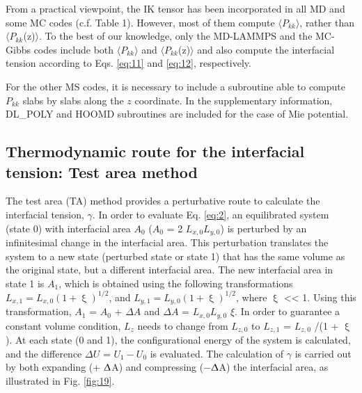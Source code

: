 \documentclass[9pt,bestpractices]{livecoms}
\begin{document}
From a practical viewpoint, the IK tensor has been incorporated in all MD and
some MC codes (c.f. Table 1). However, most of them compute
${\langle}P_{kk}{\rangle}$, rather than
${\langle}P_{kk}$(z)${\rangle}$. To the best of our knowledge, only
the MD-LAMMPS and the MC-Gibbs codes include both
${\langle}P_{kk}{\rangle}$ and
${\langle}P_{kk}$(z)${\rangle}$ and also compute the interfacial
tension according to Eqs. \ref{eq:11} and \ref{eq:12}, respectively.

For the other MS codes, it is necessary to include a subroutine able to compute
$P_{kk}$ slabs by slabs along the $z$ coordinate. In the
supplementary information, DL\_POLY and HOOMD subroutines are included for the case of Mie
potential. 

\subsection{Thermodynamic route for the interfacial tension: Test area method}

The test area (TA) method provides a perturbative route to calculate the
interfacial tension, {${\gamma}$}. In order to evaluate Eq. \ref{eq:2}, an
equilibrated system (state 0) with interfacial area $A_{0}$
($A_{0}$ = 2 $L_{x,0}L_{y,0}$) is perturbed by an
infinitesimal change in the interfacial area. This perturbation translates the
system to a new state (perturbed state or state 1) that has the same volume as
the original state, but a different interfacial area. The new interfacial area
in state 1 is $A_{1}$, which is obtained using the following
transformations $L_{x,1} = L_{x,0} (1 + \upxi)^{1/2}$, and 
$L_{y,1} = L_{y,0} (1 + \upxi)^{1/2}$, where
{${\upxi}$} {\textless}{\textless} 1. Using this transformation,
$A_{1}$ = $A_{0}$ + {${\Delta}$}$A$ and
{${\Delta}$}$A$ = $L_{x,0}L_{y,0}$ {${\xi}$}. In
order to guarantee a constant volume condition, $L_{z}$ needs to
change from $L_{z,0}$ to $L_{z,1}$ = $L_{z,0}$ /(1
+ {${\upxi}$}). At each state (0 and 1), the configurational energy of the
system is calculated, and the difference {${\Delta}$}$U$
= $U_{1}{-}U_{0}$ is evaluated. The calculation of
{${\gamma}$} is carried out by both expanding (+ {${\Updelta}$}A) and
compressing (${-}${${\Updelta}$}A) the interfacial area, as illustrated
in Fig. \ref{fig:19}.
\end{document}
